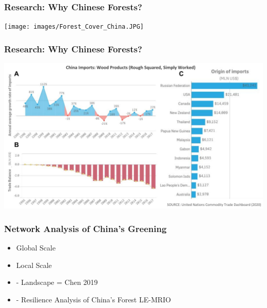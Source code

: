 \documentclass[aspectratio=169]{beamer}
\begin{document}
\begin{frame}
  \frametitle{Research: Why Chinese Forests?}

\begin{center}\texttt{[image: images/Forest\_Cover\_China.JPG]} \end{center}

\end{frame}

\begin{frame}
  \frametitle{Research: Why Chinese Forests?}

\begin{center}\includegraphics[width=0.5\linewidth]{images/comtrade_china_imports_wood.jpeg} \end{center}

\end{frame}

\begin{frame}
  \frametitle{Network Analysis of China's Greening}

  \begin{itemize}
  \item Global Scale
  \item Local Scale
  \item  - Landscape = Chen 2019
  \item  - Resilience Analysis of China's Forest LE-MRIO
  \end{itemize}

\end{frame}
\end{document}
